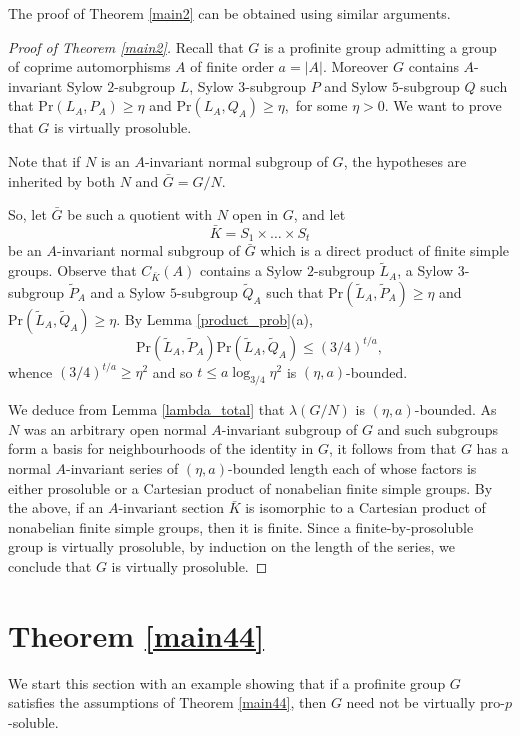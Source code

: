 \documentclass[12pt]{amsart}
\newcommand{\pr }{\mathrm{Pr} }
\newcommand{\LL }{L }
\newcommand{\R }{Q }
\begin{document}
The proof of Theorem \ref{main2} can be obtained using similar arguments. 

\begin{proof}[Proof of Theorem \ref{main2}] 
Recall that  $G$ is a profinite group admitting a  group of coprime automorphisms $A$ of finite order $a=|A|$. Moreover  $G$  contains $A$-invariant Sylow $2$-subgroup $\LL$,  Sylow $3$-subgroup $P$ and Sylow $5$-subgroup $\R$ such that $\pr( \LL_A,  P_A) \ge \eta$ and $\pr( \LL_A,  \R_A) \ge \eta,$ for some $\eta>0$.
  We want to prove that  $G$ is virtually prosoluble. 

Note that if $N$ is an $A$-invariant normal subgroup of $G$, the hypotheses are inherited by both $N$ and $\bar G=G/N$.  

So, let $\bar G$ be such a quotient with $N$ open in $G$, and let
 \[ \bar K=S_1\times\dots\times S_t\]
 be an $A$-invariant normal subgroup of  $\bar G$
  which is a direct product of finite simple groups. Observe that $C_{\bar K}(A)$ contains a Sylow $2$-subgroup $\tilde \LL_A$, a Sylow $3$-subgroup 
    $\tilde P_A$ and a Sylow $5$-subgroup $\tilde \R_A$ 
    such that $\pr(\tilde \LL_A, \tilde P_A) \ge \eta$ and $\pr(\tilde \LL_A, \tilde \R_A) \ge \eta$. 
By  Lemma \ref{product_prob}(a), 
\[ \pr(\tilde \LL_A, \tilde P_A) \pr(\tilde \LL_A, \tilde \R_A) \le  (3/4)^{t/a},\]
whence $ (3/4)^{t/a} \ge  \eta^2$ and so $t \le a \log_{3/4} \eta^2$  is  $(\eta, a)$-bounded. 
 
We deduce from Lemma \ref{lambda_total} that $\lambda(G/N)$ is   $(\eta, a)$-bounded.  As $N$ was an arbitrary open normal $A$-invariant subgroup of $G$ and such subgroups form a basis for neighbourhoods of the identity in $G$, it follows from \cite{Wilson} that $G$ has a normal $A$-invariant   series of $(\eta,a)$-bounded length each of whose factors is either prosoluble or a Cartesian product of nonabelian finite simple groups. By the above, if an $A$-invariant section $\bar K$ is isomorphic to a Cartesian product of nonabelian finite simple groups, then it is finite. Since a finite-by-prosoluble group is virtually prosoluble, by induction on the length of the series, we conclude that $G$ is virtually prosoluble. 
\end{proof}

\section{Theorem \ref{main44}}  %

 We start this section with an example showing that if a profinite group $G$ satisfies the assumptions of Theorem \ref{main44}, 
 then $G$ need not be virtually pro-$p$-soluble.
 
\end{document}
